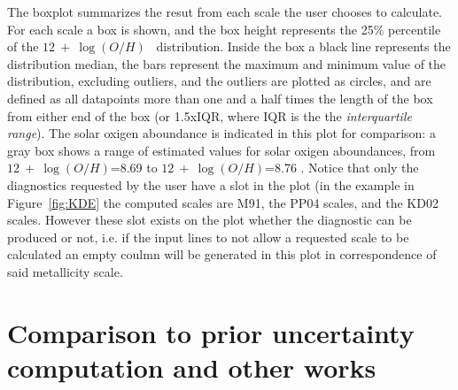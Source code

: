 \documentclass{emulateapj}
\newcommand{\oxab}{\ensuremath{12~+~\log(O/H)}}
\begin{document}
The boxplot summarizes the resut from each scale the user chooses to calculate. For each scale a box is shown, and the box height represents the 25\% percentile of the \oxab~ distribution. Inside the box a black line represents the distribution median, the bars represent the maximum and minimum value of the distribution, excluding outliers, and the outliers are plotted as circles, and are defined as all datapoints more than one and a half times the length of the box from either end of the box (or 1.5xIQR, where IQR is the the \emph{interquartile range}). The solar oxigen aboundance is indicated in this plot for comparison: a gray box shows a range of estimated values for solar oxigen aboundances, from \oxab=8.69 \citep{Asplund09} to \oxab=8.76 \citep{Caffau11}. 
Notice that only the diagnostics requested by the user have a slot in the plot (in the example in Figure~\ref{fig:KDE} the computed scales are M91, the PP04 scales, and the KD02 scales. However these slot exists on the plot whether the diagnostic can be produced or not, i.e. if the input lines to not allow a requested scale to be calculated an empty coulmn will be generated in this plot in correspondence of said metallicity scale.\











\section{Comparison to prior uncertainty computation and other works }\label{comp_sec}
\end{document}
